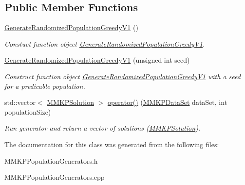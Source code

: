 \subsection*{Public Member Functions}
\begin{DoxyCompactItemize}
\item 
\hypertarget{class_generate_randomized_population_greedy_v1_a8b319a423128a1871a1874fdadbd8573}{\hyperlink{class_generate_randomized_population_greedy_v1_a8b319a423128a1871a1874fdadbd8573}{Generate\+Randomized\+Population\+Greedy\+V1} ()}\label{class_generate_randomized_population_greedy_v1_a8b319a423128a1871a1874fdadbd8573}

\begin{DoxyCompactList}\small\item\em Constuct function object \hyperlink{class_generate_randomized_population_greedy_v1}{Generate\+Randomized\+Population\+Greedy\+V1}. \end{DoxyCompactList}\item 
\hypertarget{class_generate_randomized_population_greedy_v1_a31f380a168ce525bd6f70c54730ab3da}{\hyperlink{class_generate_randomized_population_greedy_v1_a31f380a168ce525bd6f70c54730ab3da}{Generate\+Randomized\+Population\+Greedy\+V1} (unsigned int seed)}\label{class_generate_randomized_population_greedy_v1_a31f380a168ce525bd6f70c54730ab3da}

\begin{DoxyCompactList}\small\item\em Construct function object \hyperlink{class_generate_randomized_population_greedy_v1}{Generate\+Randomized\+Population\+Greedy\+V1} with a seed for a predicable population. \end{DoxyCompactList}\item 
\hypertarget{class_generate_randomized_population_greedy_v1_af39358dbec454c105e04a792df3524d7}{std\+::vector$<$ \hyperlink{class_m_m_k_p_solution}{M\+M\+K\+P\+Solution} $>$ \hyperlink{class_generate_randomized_population_greedy_v1_af39358dbec454c105e04a792df3524d7}{operator()} (\hyperlink{class_m_m_k_p_data_set}{M\+M\+K\+P\+Data\+Set} data\+Set, int population\+Size)}\label{class_generate_randomized_population_greedy_v1_af39358dbec454c105e04a792df3524d7}

\begin{DoxyCompactList}\small\item\em Run generator and return a vector of solutions (\hyperlink{class_m_m_k_p_solution}{M\+M\+K\+P\+Solution}). \end{DoxyCompactList}\end{DoxyCompactItemize}


The documentation for this class was generated from the following files\+:\begin{DoxyCompactItemize}
\item 
M\+M\+K\+P\+Population\+Generators.\+h\item 
M\+M\+K\+P\+Population\+Generators.\+cpp\end{DoxyCompactItemize}
